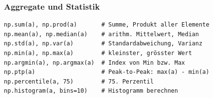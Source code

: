 \subsubsection{Aggregate und Statistik}\label{sec:07-aggregate-und-statistik}
\begin{codebox}
\begin{lstlisting}[style=CodeExpert]
np.sum(a), np.prod(a)       # Summe, Produkt aller Elemente
np.mean(a), np.median(a)    # arithm. Mittelwert, Median
np.std(a), np.var(a)        # Standardabweichung, Varianz
np.min(a), np.max(a)        # kleinster, grösster Wert
np.argmin(a), np.argmax(a)  # Index von Min bzw. Max
np.ptp(a)                   # Peak-to-Peak: max(a) - min(a)
np.percentile(a, 75)        # 75. Perzentil
np.histogram(a, bins=10)    # Histogramm berechnen
\end{lstlisting}
\end{codebox}
